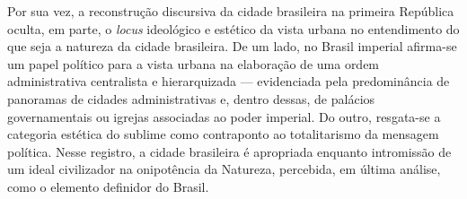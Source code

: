 Por sua vez, a reconstrução discursiva da cidade brasileira na primeira
República oculta, em parte, o \emph{locus} ideológico e estético da
vista urbana no entendimento do que seja a natureza da cidade
brasileira. De um lado, no Brasil imperial afirma-se um papel político
para a vista urbana na elaboração de uma ordem administrativa
centralista e hierarquizada --- evidenciada pela predominância de
panoramas de cidades administrativas e, dentro dessas, de palácios
governamentais ou igrejas associadas ao poder imperial. Do outro,
resgata-se a categoria estética do sublime
\autocite{naxara:2004cientificismo} como contraponto ao totalitarismo da
mensagem política. Nesse registro, a cidade brasileira é apropriada
enquanto intromissão de um ideal civilizador na onipotência da Natureza,
percebida, em última análise, como o elemento definidor do Brasil.
